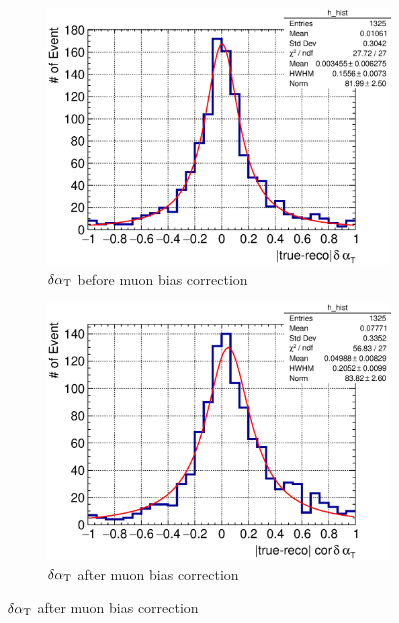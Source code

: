      \begin{figure}
          \begin{subfigure}[b]{\dbfigwid\textwidth}
               \centering
               \includegraphics[width=\textwidth]{figures/perf/tki/dalphat_rat_hist_al11_sfgmu.eps}
               \caption{$\delta\alpha_\textrm{T}$ before muon bias correction}
               \label{subfig:esc-dalpha-bfmu-sfgmu}
          \end{subfigure}         
          \begin{subfigure}[b]{\dbfigwid\textwidth}
               \centering
               \includegraphics[width=\textwidth]{figures/perf/tki/cor_dalphat_rat_hist_al11_sfgmu.eps}
               \caption{$\delta\alpha_\textrm{T}$ after muon bias correction}

\end{subfigure}
\end{figure}
